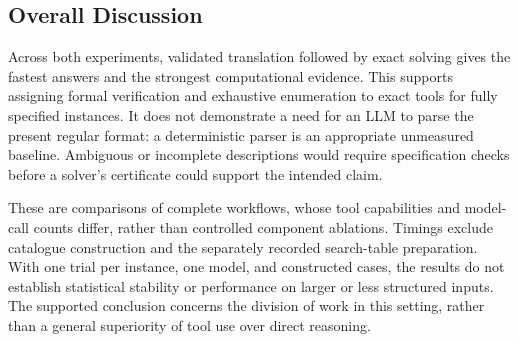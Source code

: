 \documentclass[11pt,letterpaper,titlepage]{article}
\begin{document}
\subsection{Overall Discussion}

Across both experiments, validated translation followed by exact solving gives the fastest answers and the strongest computational evidence. This supports assigning formal verification and exhaustive enumeration to exact tools for fully specified instances. It does not demonstrate a need for an LLM to parse the present regular format: a deterministic parser is an appropriate unmeasured baseline. Ambiguous or incomplete descriptions would require specification checks before a solver's certificate could support the intended claim.

These are comparisons of complete workflows, whose tool capabilities and model-call counts differ, rather than controlled component ablations. Timings exclude catalogue construction and the separately recorded search-table preparation. With one trial per instance, one model, and constructed cases, the results do not establish statistical stability or performance on larger or less structured inputs. The supported conclusion concerns the division of work in this setting, rather than a general superiority of tool use over direct reasoning.
\end{document}
